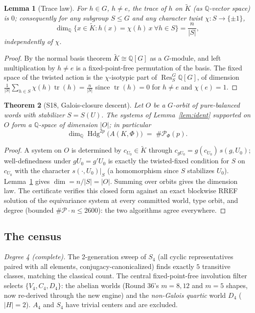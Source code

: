 \documentclass[11pt]{article}
\newtheorem{theorem}{Theorem}[section]
\newtheorem{lemma}[theorem]{Lemma}
\begin{document}
\begin{lemma}[Trace law]\label{lem:trace}
For $h\in G$, $h\ne e$, the trace of $h$ on $\widetilde K$ (as
$\mathbb Q$-vector space) is $0$; consequently for any subgroup
$S\le G$ and any character twist $\chi:S\to\{\pm1\}$,
\[
\dim_{\mathbb Q}\{x\in\widetilde K : h(x)=\chi(h)\,x\ \forall h\in S\}
= \frac{n}{|S|},
\]
independently of $\chi$.
\end{lemma}

\begin{proof}
By the normal basis theorem $\widetilde K\cong \mathbb Q[G]$ as a
$G$-module, and left multiplication by $h\ne e$ is a fixed-point-free
permutation of the basis. The fixed space of the twisted action is the
$\chi$-isotypic part of $\operatorname{Res}^G_S\mathbb Q[G]$, of dimension
$\frac1{|S|}\sum_{h\in S}\chi(h)\operatorname{tr}(h) = \frac{n}{|S|}$
since $\operatorname{tr}(h)=0$ for $h\ne e$ and $\chi(e)=1$.
\end{proof}

\begin{theorem}[S18, Galois-closure descent]\label{thm:s18}
Let $O$ be a $G$-orbit of pure-balanced words with stabilizer
$S=S(U)$. The systems of Lemma~\ref{lem:ident} supported on $O$ form a
$\mathbb Q$-space of dimension $|O|$; in particular
\[
\dim_{\mathbb Q}\operatorname{Hdg}^{2p}\!\big(A(K,\Phi)\big)
\;=\;\#\mathcal P_\Phi(p).
\]
\end{theorem}

\begin{proof}
A system on $O$ is determined by $c_{U_0}\in\widetilde K$ through
$c_{gU_0}=g(c_{U_0})\,s(g,U_0)$; well-definedness under $gU_0=g'U_0$
is exactly the twisted-fixed condition for $S$ on $c_{U_0}$ with the
character $s(\cdot,U_0)|_S$ (a homomorphism since $S$ stabilizes $U_0$).
Lemma~\ref{lem:trace} gives $\dim = n/|S| = |O|$. Summing over orbits
gives the dimension law. The certificate verifies this closed form against
an exact blockwise RREF solution of the equivariance system at every
committed world, type orbit, and degree (bounded
$\#\mathcal P\cdot n\le 2600$): the two algorithms agree everywhere.
\end{proof}

\subsection{The census}\label{sec:census}

\emph{Degree 4 (complete).} The 2-generation sweep of $S_4$ (all cyclic
representatives paired with all elements, conjugacy-canonicalized) finds
exactly $5$ transitive classes, matching the classical count. The
central fixed-point-free involution filter selects $\{V_4, C_4, D_4\}$:
the abelian worlds (Round 36's $m=8,12$ and $m=5$ shapes, now re-derived
through the new engine) and the \emph{non-Galois quartic} world $D_4$
($|H|=2$). $A_4$ and $S_4$ have trivial centers and are excluded.
\end{document}
